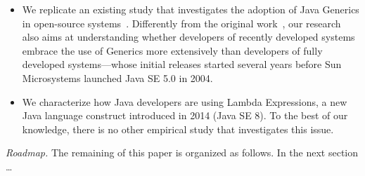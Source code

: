 \begin{itemize}
\item We replicate an existing study that investigates the 
adoption of Java Generics in open-source systems~\cite{}. Differently from 
the original work~\cite{}, our research also aims at 
understanding whether developers of recently developed 
systems embrace the use of Generics more extensively 
than developers of fully developed systems---whose initial 
releases started several years before Sun Microsystems 
launched Java SE 5.0 in 2004. 


\item We characterize how Java developers are using Lambda Expressions, 
a new Java language construct introduced in 2014 (Java SE 8). To 
the best of our knowledge, there is no other empirical study that investigates this issue.
\end{itemize}

\emph{Roadmap.} The remaining of this paper is organized 
as follows. {\color{red}In the next section \ldots} 
